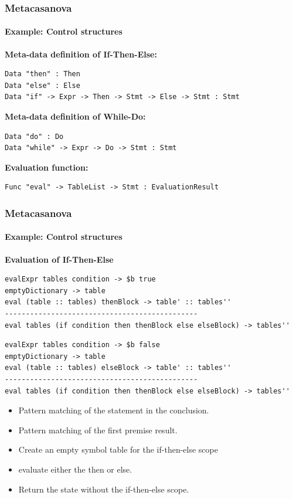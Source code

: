 \documentclass[10pt,a4paper]{beamer}
\begin{document}
\begin{frame}[fragile]
\frametitle{Metacasanova}
\framesubtitle{Example: Control structures}
\textbf{Meta-data definition of If-Then-Else:}
\begin{lstlisting}
Data "then" : Then
Data "else" : Else
Data "if" -> Expr -> Then -> Stmt -> Else -> Stmt : Stmt
\end{lstlisting}

\textbf{Meta-data definition of While-Do:}
\begin{lstlisting}
Data "do" : Do
Data "while" -> Expr -> Do -> Stmt : Stmt
\end{lstlisting}

\textbf{Evaluation function:}
\begin{lstlisting}
Func "eval" -> TableList -> Stmt : EvaluationResult
\end{lstlisting}
\end{frame}

\begin{frame}[fragile]
\frametitle{Metacasanova}
\framesubtitle{Example: Control structures}
\textbf{Evaluation of If-Then-Else}
\begin{lstlisting}
evalExpr tables condition -> $b true
emptyDictionary -> table
eval (table :: tables) thenBlock -> table' :: tables''
----------------------------------------------
eval tables (if condition then thenBlock else elseBlock) -> tables''
\end{lstlisting}

\begin{lstlisting}
evalExpr tables condition -> $b false
emptyDictionary -> table
eval (table :: tables) elseBlock -> table' :: tables''
----------------------------------------------
eval tables (if condition then thenBlock else elseBlock) -> tables''
\end{lstlisting}

\begin{itemize}
	\item Pattern matching of the statement in the conclusion.
	\item Pattern matching of the first premise result.
	\item Create an empty symbol table for the if-then-else scope
	\item evaluate either the then or else. 
	\item Return the state without the if-then-else scope.
\end{itemize}
\end{frame}
\end{document}
